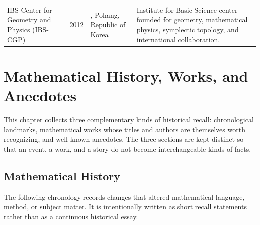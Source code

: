 {\begin{longtable}{@{}L{0.24\textwidth}L{0.10\textwidth}L{0.20\textwidth}L{0.38\textwidth}@{}}
        IBS Center for Geometry and Physics (IBS-CGP)
        & 2012
        & \POSTECH{}, Pohang, Republic of Korea
        & Institute for Basic Science center founded for geometry,
          mathematical physics, symplectic topology, and international
          collaboration. \\
    \end{longtable}
    }

    \chapter{Mathematical History, Works, and Anecdotes}

    This chapter collects three complementary kinds of historical recall:
    chronological landmarks, mathematical works whose titles and authors are
    themselves worth recognizing, and well-known anecdotes. The three sections
    are kept distinct so that an event, a work, and a story do not become
    interchangeable kinds of facts.

    \section*{Mathematical History}

    The following chronology records changes that altered mathematical
    language, method, or subject matter. It is intentionally written as short
    recall statements rather than as a continuous historical essay.

